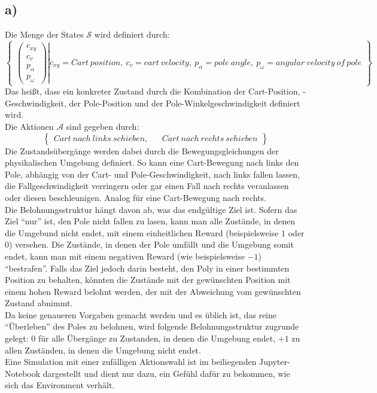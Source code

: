\documentclass[11pt]{article}
\begin{document}
\subsection*{a)}
Die Menge der States $\mathcal{S}$ wird definiert durch:
\[ %
\begin{Bmatrix}
    \left.
    \begin{pmatrix}
        c_{xy}\\
        c_v\\
        p_\alpha\\
        p_\omega
    \end{pmatrix}
    \right\vert
    c_{xy} = Cart~position,~c_v = cart~velocity,~p_\alpha = pole~angle,~p_\omega = angular~velocity~of~pole
\end{Bmatrix}
\]%
Das heißt, dass ein konkreter Zustand durch die Kombination der Cart-Position, -Geschwindigkeit, der Pole-Position und der Pole-Winkelgeschwindigkeit definiert wird.\\
Die Aktionen $\mathcal{A}$ sind gegeben durch:
\[ %
\begin{Bmatrix}
    Cart~nach~links~schieben, && Cart~nach~rechts~schieben
\end{Bmatrix}
\]%
Die Zustandsübergänge werden dabei durch die Bewegungsgleichungen der physikalischen Umgebung definiert. So kann eine Cart-Bewegung nach links den Pole, abhängig von der Cart- und Pole-Geschwindigkeit, nach links fallen lassen, die Fallgeschwindigkeit verringern oder gar einen Fall nach rechts veranlassen oder diesen beschleunigen. Analog für eine Cart-Bewegung nach rechts.\\
Die Belohnungsstruktur hängt davon ab, was das endgültige Ziel ist. Sofern das Ziel ``nur'' ist, den Pole nicht fallen zu lasen, kann man alle Zustände, in denen die Umgebund nicht endet, mit einem einheitlichen Reward (beispielsweise $1$ oder $0$) versehen. Die Zustände, in denen der Pole umfällt und die Umgebung somit endet, kann man mit einem negativen Reward (wie beispielsweise $-1$) ``bestrafen''. Falls das Ziel jedoch darin besteht, den Poly in einer bestimmten Position zu behalten, könnten die Zustände mit der gewünschten Position mit einem hohen Reward belohnt werden, der mit der Abweichung vom gewünschten Zustand abnimmt.\\
Da keine genaueren Vorgaben gemacht werden und es üblich ist, das reine ``Überleben'' des Poles zu belohnen, wird folgende Belohnungsstruktur zugrunde gelegt: $0$ für alle Übergänge zu Zustanden, in denen die Umgebung endet, $+1$ zu allen Zuständen, in denen die Umgebung nicht endet. \\
Eine Simulation mit einer zufälligen Aktionswahl ist im beiliegenden Jupyter-Notebook dargestellt und dient nur dazu, ein Gefühl dafür zu bekommen, wie sich das Environment verhält.
\end{document}
